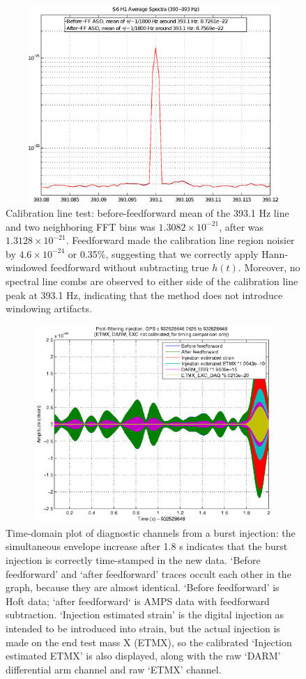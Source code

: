 \begin{figure}
\begin{center}
\includegraphics[height=75mm, width=150mm]{figure6.eps}
\caption{Calibration line test: before-feedforward mean of the 393.1 Hz line and two neighboring FFT bins was $1.3082 \times 10^{-21}$, after was $1.3128 \times 10^{-21}$. Feedforward made the calibration line region noisier by $4.6 \times 10^{-24}$ or 0.35\%, suggesting that we correctly apply Hann-windowed feedforward without subtracting true $h(t)$. Moreover, no spectral line combs are observed to either side of the calibration line peak at 393.1 Hz, indicating that the method does not introduce windowing artifacts.}
\label{calLineTest}
\end{center}
\end{figure}

\begin{figure}
\begin{center}
\includegraphics[height=75mm, width=150mm]{figure7.eps}
\caption{Time-domain plot of diagnostic channels from a burst injection: the simultaneous envelope increase after 1.8 s indicates that the burst injection is correctly time-stamped in the new data. `Before feedforward' and `after feedforward' traces occult each other in the graph, because they are almost identical. `Before feedforward' is Hoft data; `after feedforward` is AMPS data with feedforward subtraction. `Injection estimated strain' is the digital injection as intended to be introduced into strain, but the actual injection is made on the end test mass X (ETMX), so the calibrated `Injection estimated ETMX' is also displayed, along with the raw `DARM' differential arm channel and raw `ETMX' channel.}
\label{timeDomainInjection}
\end{center}
\end{figure}

